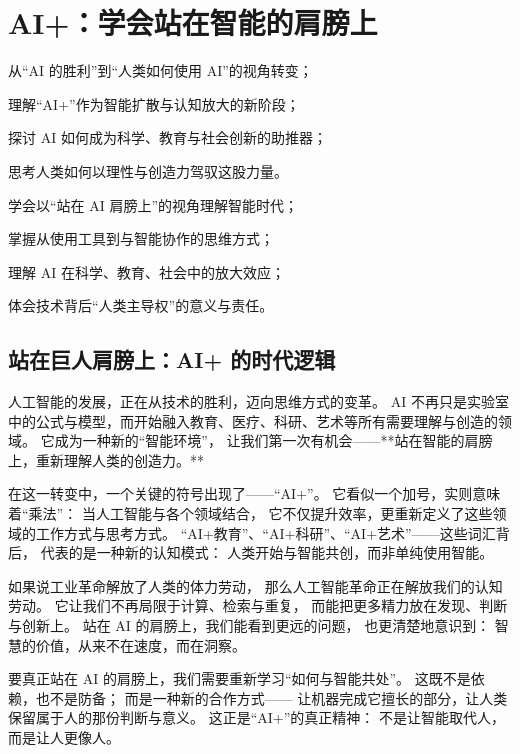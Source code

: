 \chapter{AI+：学会站在智能的肩膀上}

\begin{introduction}
  \item 从“AI 的胜利”到“人类如何使用 AI”的视角转变；
  \item 理解“AI+”作为智能扩散与认知放大的新阶段；
  \item 探讨 AI 如何成为科学、教育与社会创新的助推器；
  \item 思考人类如何以理性与创造力驾驭这股力量。
\end{introduction}

\begin{introduction}
  \item 学会以“站在 AI 肩膀上”的视角理解智能时代；
  \item 掌握从使用工具到与智能协作的思维方式；
  \item 理解 AI 在科学、教育、社会中的放大效应；
  \item 体会技术背后“人类主导权”的意义与责任。
\end{introduction}

\section{站在巨人肩膀上：AI+ 的时代逻辑}

人工智能的发展，正在从技术的胜利，迈向思维方式的变革。  
AI 不再只是实验室中的公式与模型，而开始融入教育、医疗、科研、艺术等所有需要理解与创造的领域。  
它成为一种新的“智能环境”，  
让我们第一次有机会——**站在智能的肩膀上，重新理解人类的创造力。**

在这一转变中，一个关键的符号出现了——“AI+”。  
它看似一个加号，实则意味着“乘法”：  
当人工智能与各个领域结合，  
它不仅提升效率，更重新定义了这些领域的工作方式与思考方式。  
“AI+教育”、“AI+科研”、“AI+艺术”——这些词汇背后，  
代表的是一种新的认知模式：  
人类开始与智能共创，而非单纯使用智能。

如果说工业革命解放了人类的体力劳动，  
那么人工智能革命正在解放我们的认知劳动。  
它让我们不再局限于计算、检索与重复，  
而能把更多精力放在发现、判断与创新上。  
站在 AI 的肩膀上，我们能看到更远的问题，  
也更清楚地意识到：  
智慧的价值，从来不在速度，而在洞察。

要真正站在 AI 的肩膀上，我们需要重新学习“如何与智能共处”。  
这既不是依赖，也不是防备；  
而是一种新的合作方式——  
让机器完成它擅长的部分，让人类保留属于人的那份判断与意义。  
这正是“AI+”的真正精神：  
不是让智能取代人，而是让人更像人。

